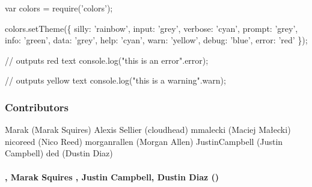 \begin{DoxyCode}
var colors = require(\textcolor{stringliteral}{'colors'});

colors.setTheme(\{
  silly: \textcolor{stringliteral}{'rainbow'},
  input: \textcolor{stringliteral}{'grey'},
  verbose: \textcolor{stringliteral}{'cyan'},
  prompt: \textcolor{stringliteral}{'grey'},
  info: \textcolor{stringliteral}{'green'},
  data: \textcolor{stringliteral}{'grey'},
  help: \textcolor{stringliteral}{'cyan'},
  warn: \textcolor{stringliteral}{'yellow'},
  debug: \textcolor{stringliteral}{'blue'},
  error: \textcolor{stringliteral}{'red'}
\});

\textcolor{comment}{// outputs red text}
console.log(\textcolor{stringliteral}{"this is an error"}.error);

\textcolor{comment}{// outputs yellow text}
console.log(\textcolor{stringliteral}{"this is a warning"}.warn);
\end{DoxyCode}


\subsubsection*{Contributors}

Marak (Marak Squires) Alexis Sellier (cloudhead) mmalecki (Maciej Małecki) nicoreed (Nico Reed) morganrallen (Morgan Allen) Justin\+Campbell (Justin Campbell) ded (Dustin Diaz)

\paragraph*{, Marak Squires , Justin Campbell, Dustin Diaz ()}